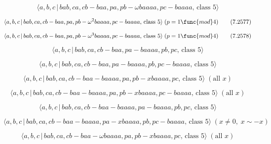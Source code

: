 \documentclass[10pt]{article}
\begin{document}
\begin{equation}
\langle a,b,c\,|\,bab,ca,cb-baa,pa,pb-\omega baaaa,pc-baaaa,\,\text{class }%
5\rangle  \tag{7.2576}
\end{equation}

\begin{equation}
\langle a,b,c\,|\,bab,ca,cb-baa,pa,pb-\omega ^{2}baaaa,pc-baaaa,\,\text{%
class }5\rangle \;(p=1\func{mod}4)  \tag{7.2577}
\end{equation}

\begin{equation}
\langle a,b,c\,|\,bab,ca,cb-baa,pa,pb-\omega ^{3}baaaa,pc-baaaa,\,\text{%
class }5\rangle \;(p=1\func{mod}4)  \tag{7.2578}
\end{equation}

\begin{equation}
\langle a,b,c\,|\,bab,ca,cb-baa,pa-baaaa,pb,pc,\,\text{class }5\rangle 
\tag{7.2579}
\end{equation}

\begin{equation}
\langle a,b,c\,|\,bab,ca,cb-baa,pa-baaaa,pb,pc-baaaa,\,\text{class }5\rangle
\tag{7.2580}
\end{equation}

\begin{equation}
\langle a,b,c\,|\,bab,ca,cb-baa-baaaa,pa,pb-xbaaaa,pc,\,\text{class }%
5\rangle \;(\text{all }x)  \tag{7.2581}
\end{equation}

\begin{equation}
\langle a,b,c\,|\,bab,ca,cb-baa-baaaa,pa,pb-xbaaaa,pc-baaaa,\,\text{class }%
5\rangle \;(\text{all }x)  \tag{7.2582}
\end{equation}

\begin{equation}
\langle a,b,c\,|\,bab,ca,cb-baa-baaaa,pa-baaaa,pb,pc,\,\text{class }5\rangle
\tag{7.2583}
\end{equation}

\begin{equation}
\langle a,b,c\,|\,bab,ca,cb-baa-baaaa,pa-xbaaaa,pb,pc-baaaa,\,\text{class }%
5\rangle \;(x\neq 0,\;x\sim -x)  \tag{7.2584}
\end{equation}

\begin{equation}
\langle a,b,c\,|\,bab,ca,cb-baa-\omega baaaa,pa,pb-xbaaaa,pc,\,\text{class }%
5\rangle \;(\text{all }x)  \tag{7.2585}
\end{equation}
\end{document}
